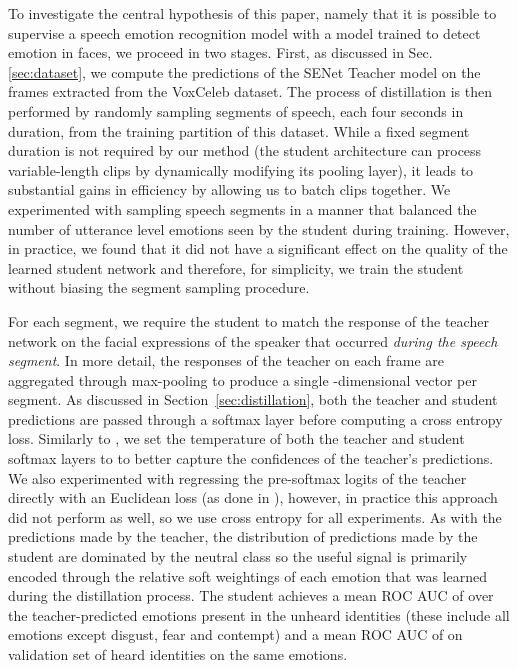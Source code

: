 \documentclass[sigconf]{acmart}
\begin{document}
To investigate the central hypothesis of this paper, namely that it is possible to supervise a speech emotion recognition model with a model trained to detect emotion in faces, we proceed in two stages.  First, as discussed in Sec. \ref{sec:dataset}, we compute the predictions of the SENet Teacher model on the frames extracted from the VoxCeleb dataset.  The process of distillation is then performed by randomly sampling segments of speech, each four seconds in duration, from the training partition of this dataset.  While a fixed segment duration is not required by our method (the student architecture can process variable-length clips by dynamically modifying its pooling layer), it leads to substantial gains in efficiency by allowing us to batch clips together.  We experimented with sampling speech segments in a manner that balanced the number of utterance level emotions seen by the student during training.  However, in practice, we found that it did not have a significant effect on the quality of the learned student network and therefore, for simplicity, we train the student without biasing the segment sampling procedure.  

For each segment, we require the student to match the response of the teacher network on the facial expressions of the speaker that occurred \textit{during the speech segment}.  In more detail, the responses of the teacher on each frame are aggregated through max-pooling to produce a single -dimensional vector per segment.  As discussed in Section~\ref{sec:distillation}, both the teacher and student predictions are passed through a softmax layer before computing a cross entropy loss. Similarly to \cite{hinton2015distilling}, we set the temperature of both the teacher and student softmax layers to  to better capture the confidences of the teacher's predictions.  We also experimented with regressing the pre-softmax logits of the teacher directly with an Euclidean loss (as done in \cite{ba2014deep}), however, in practice this approach did not perform as well, so we use cross entropy for all experiments.  As with the predictions made by the teacher, the distribution of predictions made by the student are dominated by the neutral class so the useful signal is primarily encoded through the relative soft weightings of each emotion that was learned during the distillation process. The student achieves a mean ROC AUC of  over the teacher-predicted emotions present in the unheard identities (these include all emotions except disgust, fear and contempt) and a mean ROC AUC of  on validation set of heard identities on the same emotions.
\end{document}
